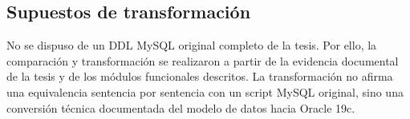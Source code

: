 \subsection{Supuestos de transformación}

No se dispuso de un DDL MySQL original completo de la tesis. Por ello, la comparación y transformación se realizaron a partir de la evidencia documental de la tesis y de los módulos funcionales descritos. La transformación no afirma una equivalencia sentencia por sentencia con un script MySQL original, sino una conversión técnica documentada del modelo de datos hacia Oracle 19c.
